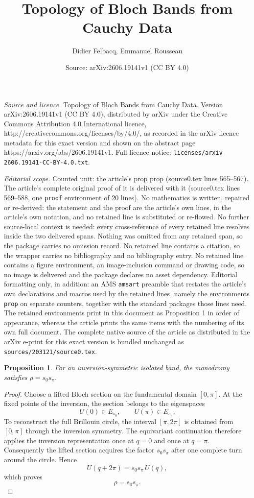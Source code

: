 \documentclass[10pt,a4paper]{amsart}
\title{Topology of Bloch Bands from Cauchy Data}
\author{Didier Felbacq, Emmanuel Rousseau}
\date{Source: arXiv:2606.19141v1 (CC BY 4.0)}
\newtheorem{prop}{Proposition}
\begin{document}
\maketitle

\noindent\emph{Source and licence.} Topology of Bloch Bands from Cauchy Data. Version arXiv:2606.19141v1 (CC BY 4.0), distributed by arXiv under the Creative Commons Attribution 4.0 International licence, http://creativecommons.org/licenses/by/4.0/, as recorded in the arXiv licence metadata for this exact version and shown on the abstract page https://arxiv.org/abs/2606.19141v1. Full licence notice: \texttt{licenses/arxiv-2606.19141-CC-BY-4.0.txt}.\par\smallskip

\noindent\textit{Editorial scope.} Counted unit: the article's prop prop (source0.tex lines 565--567). The article's complete original proof of it is delivered with it (source0.tex lines 569--588, one \texttt{proof} environment of 20 lines). No mathematics is written, repaired or re-derived: the statement and the proof are the article's own lines, in the article's own notation, and no retained line is substituted or re-flowed.  No further source-local context is needed: every cross-reference of every retained line resolves inside the two delivered spans.  Nothing was omitted from any retained span, so the package carries no omission record.  No retained line contains a citation, so the wrapper carries no bibliography and no bibliography entry.  No retained line contains a figure environment, an image-inclusion command or drawing code, so no image is delivered and the package declares no asset dependency.  Editorial formatting only, in addition: an AMS \texttt{amsart} preamble that restates the article's own declarations and macros used by the retained lines, namely the environments \texttt{prop} on separate counters, together with the standard packages those lines need.  The retained environments print in this document as Proposition 1 in order of appearance, whereas the article prints the same items with the numbering of its own full document.  The complete native source of the article as distributed in the arXiv e-print for this exact version is bundled unchanged as \texttt{sources/203121/source0.tex}.
\begin{prop}
For an inversion-symmetric isolated band, the monodromy satisfies $\rho=s_0s_\pi$.
\end{prop}

\begin{proof}
Choose a lifted Bloch section on the fundamental domain
$[0,\pi]$. At the fixed points of the inversion, the section belongs to the eigenspaces
$$
U(0)\in E_{s_0},
\qquad
U(\pi)\in E_{s_\pi}.
$$
To reconstruct the full Brillouin circle, the interval $[\pi,2\pi]$ is obtained from $[0,\pi]$
through the inversion symmetry. The equivariant continuation therefore applies
the inversion representation once at $q=0$ and once at $q=\pi$. Consequently the lifted section acquires the factor
$s_0s_\pi$ after one complete turn around the circle. Hence
$$
U(q+2\pi)=s_0s_\pi\,U(q),
$$
which proves
$$
\rho=s_0s_\pi .
$$
\end{proof}
\end{document}
